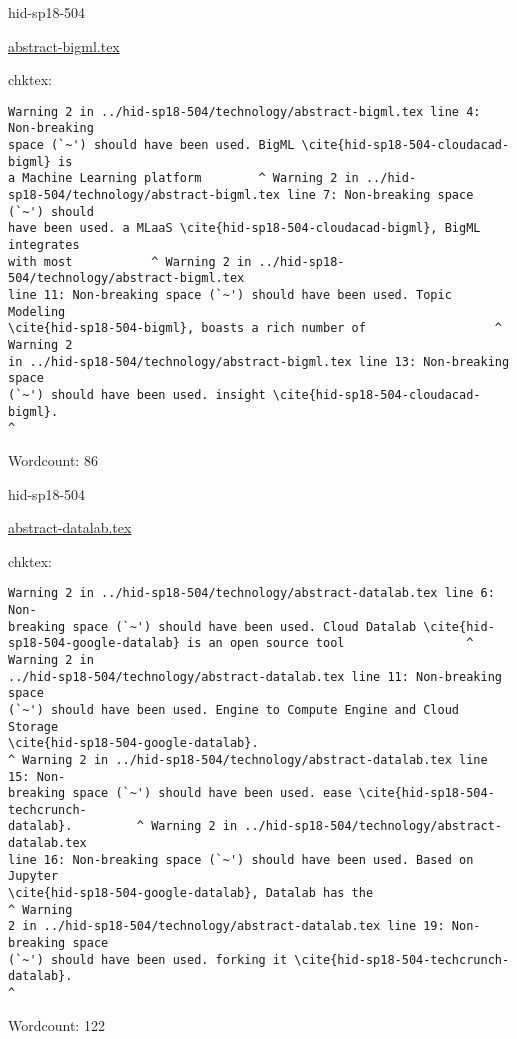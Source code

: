 

\begin{IU}

hid-sp18-504

\href{https://github.com/cloudmesh-community/hid-sp18-504/blob/master//technology/abstract-bigml.tex}{abstract-bigml.tex}

 
chktex:
\begin{tiny}
\begin{verbatim}
Warning 2 in ../hid-sp18-504/technology/abstract-bigml.tex line 4: Non-breaking
space (`~') should have been used. BigML \cite{hid-sp18-504-cloudacad-bigml} is
a Machine Learning platform        ^ Warning 2 in ../hid-
sp18-504/technology/abstract-bigml.tex line 7: Non-breaking space (`~') should
have been used. a MLaaS \cite{hid-sp18-504-cloudacad-bigml}, BigML integrates
with most           ^ Warning 2 in ../hid-sp18-504/technology/abstract-bigml.tex
line 11: Non-breaking space (`~') should have been used. Topic Modeling
\cite{hid-sp18-504-bigml}, boasts a rich number of                  ^ Warning 2
in ../hid-sp18-504/technology/abstract-bigml.tex line 13: Non-breaking space
(`~') should have been used. insight \cite{hid-sp18-504-cloudacad-bigml}.
^
\end{verbatim}
\end{tiny}

Wordcount: 86

\end{IU}



\begin{IU}

hid-sp18-504

\href{https://github.com/cloudmesh-community/hid-sp18-504/blob/master//technology/abstract-datalab.tex}{abstract-datalab.tex}

 
chktex:
\begin{tiny}
\begin{verbatim}
Warning 2 in ../hid-sp18-504/technology/abstract-datalab.tex line 6: Non-
breaking space (`~') should have been used. Cloud Datalab \cite{hid-
sp18-504-google-datalab} is an open source tool                 ^ Warning 2 in
../hid-sp18-504/technology/abstract-datalab.tex line 11: Non-breaking space
(`~') should have been used. Engine to Compute Engine and Cloud Storage
\cite{hid-sp18-504-google-datalab}.
^ Warning 2 in ../hid-sp18-504/technology/abstract-datalab.tex line 15: Non-
breaking space (`~') should have been used. ease \cite{hid-sp18-504-techcrunch-
datalab}.         ^ Warning 2 in ../hid-sp18-504/technology/abstract-datalab.tex
line 16: Non-breaking space (`~') should have been used. Based on Jupyter
\cite{hid-sp18-504-google-datalab}, Datalab has the                    ^ Warning
2 in ../hid-sp18-504/technology/abstract-datalab.tex line 19: Non-breaking space
(`~') should have been used. forking it \cite{hid-sp18-504-techcrunch-datalab}.
^
\end{verbatim}
\end{tiny}

Wordcount: 122

\end{IU}

